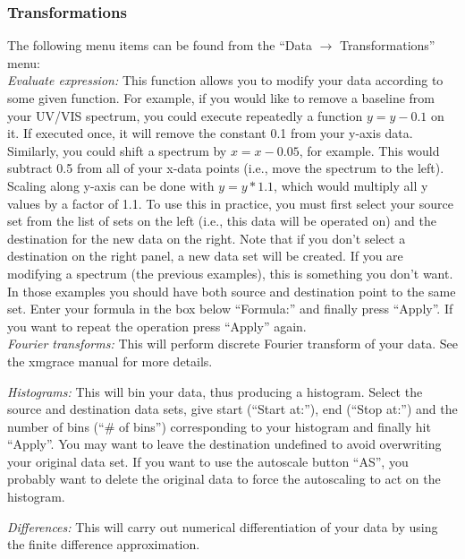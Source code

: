 \documentclass[byrevtex,amssymb,aps,pra,floatfix,letterpaper]{revtex4}
\begin{document}
\subsubsection{Transformations}

The following menu items can be found from the ``Data $\rightarrow$ Transformations'' menu:\\

\noindent
\textit{Evaluate expression:} This function allows you to modify your data according to some given function. For example, if you would like to remove a baseline from your UV/VIS spectrum, you could execute repeatedly a function $y = y - 0.1$ on it. If executed once, it will remove the constant 0.1 from your y-axis data. Similarly, you could shift a spectrum by $x = x - 0.05$, for example. This would subtract 0.5 from all of your x-data points (i.e., move the spectrum to the left). Scaling along y-axis can be done with $y = y * 1.1$, which would multiply all y values by a factor of 1.1. To use this in practice, you must first select your source set from the list of sets on the left (i.e., this data will be operated on) and the destination for the new data on the right. Note that if you don't select a destination on the right panel, a new data set will be created. If you are modifying a spectrum (the previous examples), this is something you don't want. In those examples you should have both source and destination point to the same set. Enter your formula in the box below ``Formula:'' and finally press ``Apply''. If you want to repeat the operation press ``Apply'' again.\\

\noindent
\textit{Fourier transforms:} This will perform discrete Fourier transform of your data. See the xmgrace manual for more details.

\noindent
\textit{Histograms:} This will bin your data, thus producing a histogram. Select the source and destination data sets, give start (``Start at:''), end (``Stop at:'') and the number of bins (``\# of bins'') corresponding to your histogram and finally hit ``Apply''. You may want to leave the destination undefined to avoid overwriting your original data set. If you want to use the autoscale button ``AS'', you probably want to delete the original data to force the autoscaling to act on the histogram.

\noindent
\textit{Differences:} This will carry out numerical differentiation of your data by using the finite difference approximation.
\end{document}
